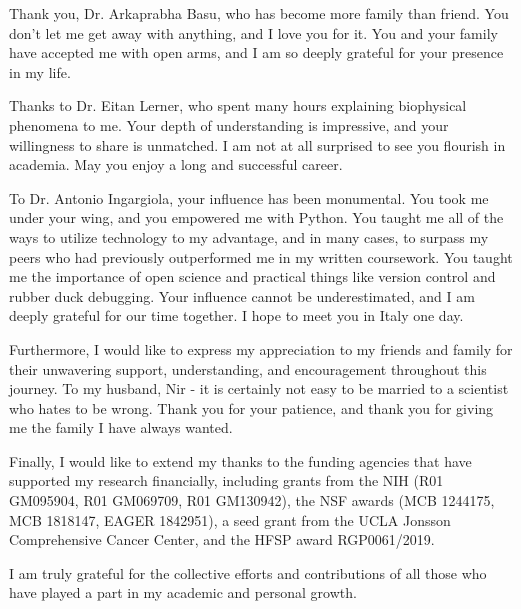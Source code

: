 Thank you, Dr. Arkaprabha Basu, who has become more family than friend. 
You don't let me get away with anything, and I love you for it.
You and your family have accepted me with open arms, and I am so deeply grateful for your presence in my life.

Thanks to Dr. Eitan Lerner, who spent many hours explaining biophysical phenomena to me. 
Your depth of understanding is impressive, and your willingness to share is unmatched. 
I am not at all surprised to see you flourish in academia.
May you enjoy a long and successful career. 

To Dr. Antonio Ingargiola, your influence has been monumental.
You took me under your wing, and you empowered me with Python.
You taught me all of the ways to utilize technology to my advantage, and in many cases, to surpass my peers who had previously outperformed me in my written coursework. 
You taught me the importance of open science and practical things like version control and rubber duck debugging.
Your influence cannot be underestimated, and I am deeply grateful for our time together. 
I hope to meet you in Italy one day. 

Furthermore, I would like to express my appreciation to my friends and family for their unwavering support, understanding, and encouragement throughout this journey. 
To my husband, Nir - 
it is certainly not easy to be married to a scientist who hates to be wrong.
Thank you for your patience, and thank you for giving me the family I have always wanted. 

Finally, I would like to extend my thanks to the funding agencies that have supported my research financially, including grants from the NIH (R01 GM095904, R01 GM069709, R01 GM130942), the NSF awards (MCB 1244175, MCB 1818147, EAGER 1842951), a seed grant from the UCLA Jonsson Comprehensive Cancer Center, and the HFSP award RGP0061/2019. 

\vspace{3em}

\noindent{}I am truly grateful for the collective efforts and contributions of all those who have played a part in my academic and personal growth.

\vspace*{\fill}